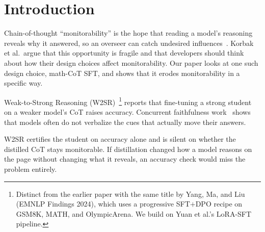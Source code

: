 \documentclass{article}
\begin{document}
\begin{abstract}
much the cue moves the answer. A second arm isolates how much of the effect a
shorter trace can produce on its own. Due
to a chat-template defect we document in \S\ref{sec:supervision}, an earlier
run supervised the same student on the \emph{final-answer segments} of the same
traces; that arm compresses CoT $14\times$ and drives acknowledgment to $3.2\%$,
so answer-only supervision reproduces a far larger collapse than
reasoning-preserving supervision does. Length alone is nonetheless
insufficient: at matched length and matched cue composition the gap persists in
direction and effect size under every construction we tried, though each is
fragile: the two that hold the question pool fixed rest on $7$ and $8$ records
(reaching $p = 0.23$ and $p = 0.019$, the latter on a zero cell)
(\S\ref{sec:mech}), and the collapse replicates on MMLU at $2.8\times$
compression rather than $14\times$. A same-strength
self-distillation control makes the weak-to-strong asymmetry an unlikely cause,
though that control was run under answer-only supervision and is correspondingly
weak (\S\ref{sec:lim}).
A capability-only certification can pass a model whose CoT has become markedly
less revealing while still reading as elaborate.
\end{abstract}

\section{Introduction}

Chain-of-thought ``monitorability'' is the hope that reading a model's
reasoning reveals why it answered, so an overseer can catch undesired
influences~\cite{korbak2025}. Korbak et al.\ argue that this opportunity is
fragile and that developers should think about how their design choices affect
monitorability. Our paper looks at one such design choice, math-CoT SFT, and
shows that it erodes monitorability in a specific way.

Weak-to-Strong Reasoning (W2SR)~\cite{yuan2025}\footnote{Distinct from the
earlier paper with the same title by Yang, Ma, and Liu~\cite{yang2024w2sr}
(EMNLP Findings 2024), which uses a progressive SFT$+$DPO recipe on GSM8K,
MATH, and OlympicArena. We build on Yuan et al.'s LoRA-SFT pipeline.} reports
that fine-tuning a strong student on a weaker model's CoT raises accuracy.
Concurrent faithfulness work~\cite{turpin2023,meek2025,chua2025} shows that
models often do not verbalize the cues that actually move their answers.

W2SR certifies the student on accuracy alone and is silent on whether the
distilled CoT stays monitorable. If distillation changed how a model reasons on
the page without changing what it reveals, an accuracy check would miss the
problem entirely.
\end{document}
